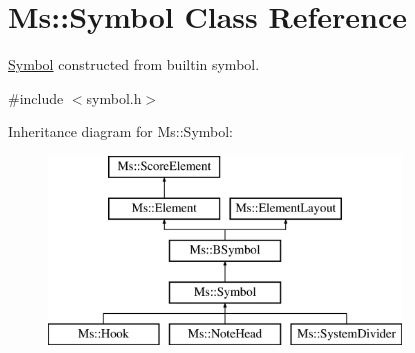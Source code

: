 \hypertarget{class_ms_1_1_symbol}{}\section{Ms\+:\+:Symbol Class Reference}
\label{class_ms_1_1_symbol}


\hyperlink{class_ms_1_1_symbol}{Symbol} constructed from builtin symbol.  




{\ttfamily \#include $<$symbol.\+h$>$}

Inheritance diagram for Ms\+:\+:Symbol\+:\begin{figure}[H]
\begin{center}
\leavevmode
\includegraphics[height=5.000000cm]{class_ms_1_1_symbol}
\end{center}
\end{figure}
